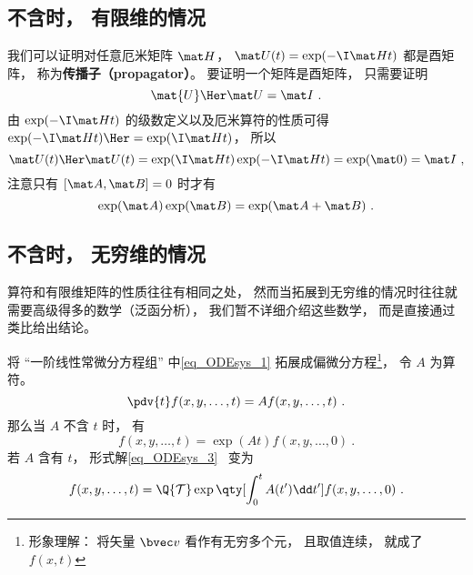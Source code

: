 

\subsection{不含时， 有限维的情况}
我们可以证明对任意厄米矩阵 $\mat H$， $\mat U(t) = \exp(-\I \mat H t)$ 都是酉矩阵， 称为\textbf{传播子（propagator）}。 要证明一个矩阵是酉矩阵， 只需要证明
\begin{equation}
\mat{U}\Her \mat U = \mat I~.
\end{equation}
由 $\exp(-\I \mat H t)$ 的级数定义以及厄米算符的性质可得 $\exp(-\I \mat H t)\Her = \exp(\I \mat H t)$， 所以
\begin{equation}
\mat U(t)\Her \mat U(t) = \exp(\I \mat H t) \exp(-\I \mat H t) = \exp(\mat 0) = \mat I~,
\end{equation}
注意只有 $[\mat A, \mat B] = 0$ 时才有
\begin{equation}\label{eq_OpExp_1}
\exp(\mat A)\exp(\mat B) = \exp(\mat A + \mat B)~.
\end{equation}

\subsection{不含时， 无穷维的情况}

算符和有限维矩阵的性质往往有相同之处， 然而当拓展到无穷维的情况时往往就需要高级得多的数学（泛函分析）， 我们暂不详细介绍这些数学， 而是直接通过类比给出结论。

将 “一阶线性常微分方程组” 中\autoref{eq_ODEsys_1} 拓展成偏微分方程\footnote{形象理解： 将矢量 $\bvec v$ 看作有无穷多个元， 且取值连续， 就成了 $f(x, t)$}， 令 $A$ 为算符。
\begin{equation}
\pdv{t} f(x, y, \dots, t) = A f(x, y, \dots, t)~.
\end{equation}
那么当 $A$ 不含 $t$ 时， 有
\begin{equation}
f(x, y, \dots, t) = \exp(A t) f(x, y, \dots, 0)~.
\end{equation}
若 $A$ 含有 $t$， 形式解\autoref{eq_ODEsys_3}~ 变为
\begin{equation}
f(x, y, \dots, t) = \Q {\mathcal T} \exp\qty[\int_0^ t A(t')\dd t'] f(x, y, \dots, 0)~.
\end{equation}

